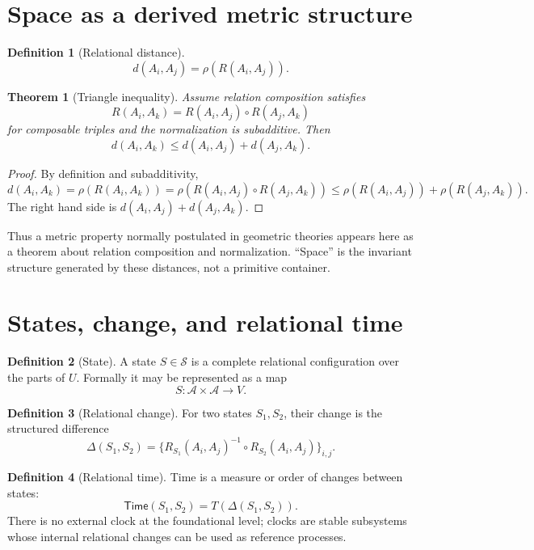 \documentclass[11pt,a4paper]{article}
\theoremstyle{definition}
\newtheorem{definition}{Definition}[section]
\theoremstyle{plain}
\newtheorem{theorem}{Theorem}[section]
\theoremstyle{remark}
\newcommand{\Whole}{U}
\newcommand{\Parts}{\mathcal A}
\newcommand{\Rel}{R}
\newcommand{\Values}{V}
\newcommand{\State}{S}
\newcommand{\States}{\mathcal S}
\newcommand{\comp}{\circ}
\newcommand{\norm}{\rho}
\newcommand{\Time}{\mathsf{Time}}
\begin{document}
\section{Space as a derived metric structure}

\begin{definition}[Relational distance]
\[
d(A_i,A_j)=\norm(\Rel(A_i,A_j)).
\]
\end{definition}

\begin{theorem}[Triangle inequality]
Assume relation composition satisfies
\[
\Rel(A_i,A_k)=\Rel(A_i,A_j)\comp\Rel(A_j,A_k)
\]
for composable triples and the normalization is subadditive. Then
\[
d(A_i,A_k)\leq d(A_i,A_j)+d(A_j,A_k).
\]
\end{theorem}

\begin{proof}
By definition and subadditivity,
\[
d(A_i,A_k)=\norm(\Rel(A_i,A_k))
=\norm(\Rel(A_i,A_j)\comp\Rel(A_j,A_k))
\leq \norm(\Rel(A_i,A_j))+\norm(\Rel(A_j,A_k)).
\]
The right hand side is \(d(A_i,A_j)+d(A_j,A_k)\).
\end{proof}

Thus a metric property normally postulated in geometric theories appears here as
a theorem about relation composition and normalization. ``Space'' is the
invariant structure generated by these distances, not a primitive container.

\section{States, change, and relational time}

\begin{definition}[State]
A state \(\State\in\States\) is a complete relational configuration over the
parts of \(\Whole\). Formally it may be represented as a map
\[
\State:\Parts\times\Parts\to\Values .
\]
\end{definition}

\begin{definition}[Relational change]
For two states \(S_1,S_2\), their change is the structured difference
\[
\Delta(S_1,S_2)=\{\Rel_{S_1}(A_i,A_j)^{-1}\comp \Rel_{S_2}(A_i,A_j)\}_{i,j}.
\]
\end{definition}

\begin{definition}[Relational time]
Time is a measure or order of changes between states:
\[
\Time(S_1,S_2)=T(\Delta(S_1,S_2)).
\]
There is no external clock at the foundational level; clocks are stable
subsystems whose internal relational changes can be used as reference processes.
\end{definition}
\end{document}

